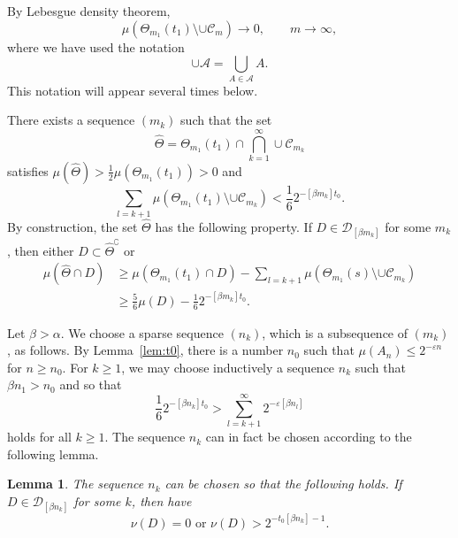 \documentclass[10pt]{amsart}
\newtheorem{lemm}[theo]{Lemma}\newtheorem{prop}[theo]{Proposition}\newtheorem{coro}[theo]{Corollary}\newtheorem{conj}[theo]{Conjecture}
\theoremstyle{definition}\newtheorem{defi}[theo]{Definition}\newtheorem{rema}[theo]{Remark}\newtheorem{exam}[theo]{Example}\newtheorem{exem}[theo]{Example}\newtheorem{nota}[theo]{Notation}
\begin{document}
By Lebesgue density theorem,
\[
\mu (\Theta_{m_1} (t_1) \setminus \cup \mathscr{C}_m) \to 0, \qquad m
\to \infty,
\]
where we have used the notation
\[
\cup \mathscr{A} = \bigcup_{A \in \mathscr{A}} A.
\]
This notation will appear several times below.

There exists a sequence $(m_k)$ such that the set
\[
\hat{\Theta} = \Theta_{m_1} (t_1) \cap \bigcap_{k=1}^\infty \cup \mathscr{C}_{m_k}
\]
satisfies $\mu (\hat{\Theta}) > \frac{1}{2} \mu (\Theta_{m_1} (t_1)) > 0$ and
\[
\sum_{l = k + 1} \mu (\Theta_{m_1} (t_1) \setminus \cup
\mathscr{C}_{m_k}) < \frac{1}{6} 2^{-[\beta m_k] t_0}.
\]
By construction, the set $\hat{\Theta}$ has the following property. If $D \in \mathscr{D}_{[\beta m_k]}$ for some $m_k$, then either $D
\subset \hat{\Theta}^\complement$ or
\begin{align}\label{eq:propertyofDelta}
\mu (\hat{\Theta} \cap D) &\geq \mu (\Theta_{m_1} (t_1) \cap D) -
\sum_{l = k + 1} \mu (\Theta_{m_1} (s) \setminus \cup
\mathscr{C}_{m_k}) \nonumber \\ &\geq \frac{5}{6} \mu (D) -
\frac{1}{6} 2^{-[\beta m_k] t_0}.
\end{align}

Let $\beta > \alpha$. We choose a sparse sequence $(n_k)$, which is a subsequence of $(m_k)$, as follows. By Lemma~\ref{lem:t0}, there is a number $n_0$ such that $\mu (A_n) \leq 2^{- \varepsilon n}$ for $n
\geq n_0$. For $k \geq 1$, we may choose inductively a sequence $n_k$ such that $\beta n_1 > n_0$ and so that
\begin{equation}\label{eq:nk}
\frac{1}{6} 2^{- [\beta n_k] t_0} > \sum_{l = k+1}^\infty 2^{- \varepsilon [\beta n_l]}
\end{equation}
holds for all $k \geq 1$. The sequence $n_k$ can in fact be chosen according to the following lemma.

\begin{lemm}\label{lem:nu}
The sequence $n_k$ can be chosen so that the following holds. If $D \in \mathscr{D}_{[\beta n_k]}$ for some $k$, then have
\[
\nu (D) = 0 \text{ or } \nu (D) > 2^{- t_0 [\beta n_k] - 1}.
\]
\end{lemm}
\end{document}
